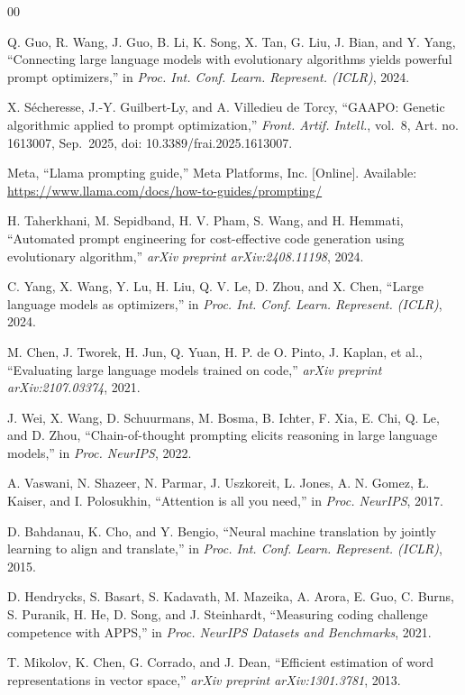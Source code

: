 \documentclass[conference]{IEEEtran}
\begin{document}

\begin{thebibliography}{00}

Q. Guo, R. Wang, J. Guo, B. Li, K. Song, X. Tan, G. Liu, J. Bian, and Y. Yang,
``Connecting large language models with evolutionary algorithms yields powerful prompt
optimizers,'' in \textit{Proc. Int. Conf. Learn. Represent. (ICLR)}, 2024.

X. S\'{e}cheresse, J.-Y. Guilbert-Ly, and A. Villedieu de Torcy,
``GAAPO: Genetic algorithmic applied to prompt optimization,''
\textit{Front. Artif. Intell.}, vol.\ 8, Art. no. 1613007, Sep.\ 2025,
doi: 10.3389/frai.2025.1613007.

Meta, ``Llama prompting guide,'' Meta Platforms, Inc. [Online]. Available:
\url{https://www.llama.com/docs/how-to-guides/prompting/}

H. Taherkhani, M. Sepidband, H. V. Pham, S. Wang, and H. Hemmati,
``Automated prompt engineering for cost-effective code generation using evolutionary
algorithm,'' \textit{arXiv preprint arXiv:2408.11198}, 2024.

C. Yang, X. Wang, Y. Lu, H. Liu, Q. V. Le, D. Zhou, and X. Chen,
``Large language models as optimizers,''
in \textit{Proc. Int. Conf. Learn. Represent. (ICLR)}, 2024.

M. Chen, J. Tworek, H. Jun, Q. Yuan, H. P. de O. Pinto, J. Kaplan, et al.,
``Evaluating large language models trained on code,''
\textit{arXiv preprint arXiv:2107.03374}, 2021.

J. Wei, X. Wang, D. Schuurmans, M. Bosma, B. Ichter, F. Xia, E. Chi, Q. Le, and D. Zhou,
``Chain-of-thought prompting elicits reasoning in large language models,''
in \textit{Proc. NeurIPS}, 2022.

A. Vaswani, N. Shazeer, N. Parmar, J. Uszkoreit, L. Jones, A. N. Gomez, \L. Kaiser,
and I. Polosukhin,
``Attention is all you need,''
in \textit{Proc. NeurIPS}, 2017.

D. Bahdanau, K. Cho, and Y. Bengio,
``Neural machine translation by jointly learning to align and translate,''
in \textit{Proc. Int. Conf. Learn. Represent. (ICLR)}, 2015.

D. Hendrycks, S. Basart, S. Kadavath, M. Mazeika, A. Arora, E. Guo, C. Burns,
S. Puranik, H. He, D. Song, and J. Steinhardt,
``Measuring coding challenge competence with APPS,''
in \textit{Proc. NeurIPS Datasets and Benchmarks}, 2021.

T. Mikolov, K. Chen, G. Corrado, and J. Dean,
``Efficient estimation of word representations in vector space,''
\textit{arXiv preprint arXiv:1301.3781}, 2013.

\end{thebibliography}
\end{document}
